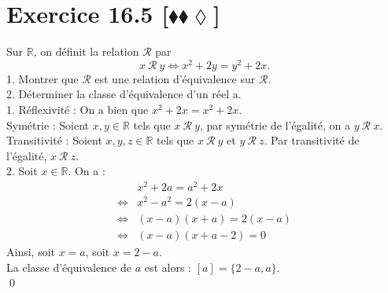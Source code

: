 \documentclass[10pt]{article}
\begin{document}
\section*{Exercice 16.5 [$\blacklozenge\blacklozenge\lozenge$]}
\begin{tcolorbox}[enhanced, width=7.6in, center, size=fbox, fontupper=\large, drop shadow southwest]
    Sur $\mathbb{R}$, on définit la relation $\mathcal{R}$ par
    \begin{equation*}
        x~\mathcal{R}~y \iff x^2 + 2y = y^2 + 2x.
    \end{equation*}
    1. Montrer que $\mathcal{R}$ est une relation d'équivalence sur $\mathcal{R}$.\\
    2. Déterminer la classe d'équivalence d'un réel a.\\[0.15cm]
    1. Réflexivité : On a bien que $x^2 + 2x = x^2 + 2x$.\\
    Symétrie : Soient $x,y\in\mathbb{R}$ tels que $x~\mathcal{R}~y$, par symétrie de l'égalité, on a $y~\mathcal{R}~x$.\\
    Transitivité : Soient $x,y,z\in\mathbb{R}$ tels que $x~\mathcal{R}~y$ et $y~\mathcal{R}~z$. Par transitivité de l'égalité, $x~\mathcal{R}~z$.\\[0.15cm]
    2. Soit $x\in\mathbb{R}$. On a :
    \begin{align*}
        &x^2 + 2a = a^2 + 2x\\
        \iff&x^2 - a^2 = 2(x-a)\\
        \iff&(x-a)(x+a)=2(x-a)\\
        \iff&(x-a)(x+a-2)=0
    \end{align*}
    Ainsi, soit $x=a$, soit $x=2-a$.\\
    La classe d'équivalence de $a$ est alors : $[a]=\{2-a,a\}$.\\
    \qed
\end{tcolorbox}
\end{document}
